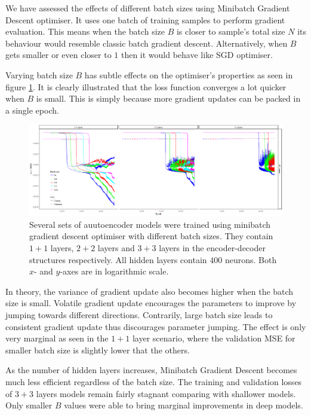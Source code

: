 \documentclass[11pt]{article} %
\theoremstyle{plain}
\theoremstyle{definition}
\begin{document}
We have assessed the effects of different batch sizes using Minibatch Gradient Descent optimiser. It uses one batch of training samples to perform gradient evaluation. This means when the batch size \(B\) is closer to sample's total size \(N\) its behaviour would resemble classic batch gradient descent. Alternatively, when \(B\) gets smaller or even closer to \(1\) then it would behave like SGD optimiser.

Varying batch size \(B\) has subtle effects on the optimiser's properties as seen in figure \ref{fig:minibatch_batch_size}. It is clearly illustrated that the loss function converges a lot quicker when \(B\) is small. This is simply because more gradient updates can be packed in a single epoch.

\begin{figure}[H]
	\centering
	\includegraphics[width=1\textwidth]{minibatch_batch_size.PNG}
	\caption{Several sets of auutoencoder models were trained using minibatch gradient descent optimiser with different batch sizes. They contain \(1+1\) layers, \(2+2\) layers and \(3+3\) layers in the encoder-decoder structures respectively. All hidden layers contain \(400\) neurons. Both \(x\)- and  \(y\)-axes are in logarithmic scale.}
	\label{fig:minibatch_batch_size}
\end{figure}

In theory, the variance of gradient update also becomes higher when the batch size is small. Volatile gradient update encourages the parameters to improve by jumping towards different directions. Contrarily, large batch size leads to consistent gradient update thus discourages parameter jumping. The effect is only very marginal as seen in the \(1+1\) layer scenario, where the validation MSE for smaller batch size is slightly lower that the others.

As the number of hidden layers increases, Minibatch Gradient Descent becomes much less efficient regardless of the batch size. The training and validation losses of \(3+3\) layers models remain fairly stagnant comparing with shallower models. Only smaller \(B\) values were able to bring marginal improvements in deep models.
\end{document}
